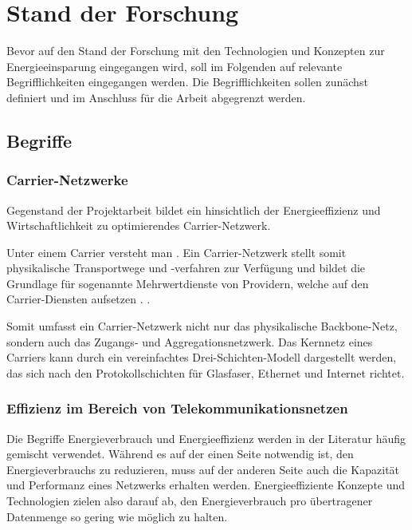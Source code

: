 \section{Stand der Forschung} \label{SdF}

Bevor auf den Stand der Forschung mit den Technologien und Konzepten zur Energieeinsparung eingegangen wird, soll im Folgenden auf relevante Begrifflichkeiten eingegangen werden. Die Begrifflichkeiten sollen zunächst definiert und im Anschluss für die Arbeit abgegrenzt werden.  

\subsection{Begriffe}

\subsubsection{Carrier-Netzwerke}
Gegenstand der Projektarbeit bildet ein hinsichtlich der Energieeffizienz und Wirtschaftlichkeit zu optimierendes Carrier-Netzwerk.

Unter einem Carrier versteht man  \cite{carrier}. Ein Carrier-Netzwerk stellt somit physikalische Transportwege und -verfahren zur Verfügung und bildet die Grundlage für sogenannte Mehrwertdienste von Providern, welche auf den Carrier-Diensten aufsetzen \cite{fassnacht}.  \cite{fassnacht}.

Somit umfasst ein Carrier-Netzwerk nicht nur das physikalische Backbone-Netz, sondern auch das Zugangs- und Aggregationsnetzwerk. Das Kernnetz eines Carriers kann durch ein vereinfachtes Drei-Schichten-Modell dargestellt werden, das sich nach den Protokollschichten für Glasfaser, Ethernet und Internet richtet. 

\subsubsection{Effizienz im Bereich von Telekommunikationsnetzen}
Die Begriffe Energieverbrauch und Energieeffizienz werden in der Literatur häufig gemischt verwendet. Während es auf der einen Seite notwendig ist, den Energieverbrauchs zu reduzieren, muss auf der anderen Seite auch die Kapazität und Performanz eines Netzwerks erhalten werden. Energieeffiziente Konzepte und Technologien zielen also darauf ab, den Energieverbrauch pro übertragener Datenmenge so gering wie möglich zu halten. \cite{aleksic2013}

